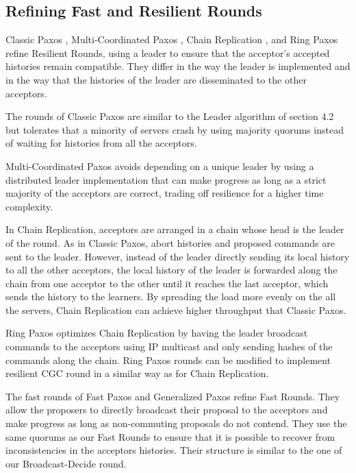 \subsection{Refining Fast and Resilient Rounds}

Classic Paxos \cite{lamport2001paxos}, Multi-Coordinated Paxos \cite{CamargosSchmidtPedone07MulticoordinatedPaxos}, Chain Replication \cite{RenesseSchneider04ChainReplicationSupportingHighThroughputAvailability}, and Ring Paxos \cite{MarandiETAL10RingPaxosHighthroughputAtomicBroadcastProtocol} refine Resilient Rounds, using a leader to ensure that the acceptor's accepted histories remain compatible. They differ in the way the leader is
implemented and in the way that the histories of the leader are disseminated to
the other acceptors.

The rounds of Classic Paxos are similar to the Leader algorithm of section 4.2 but
tolerates that a minority of servers crash by using majority quorums instead of
waiting for histories from all the acceptors.

Multi-Coordinated Paxos avoids depending on a unique leader by using a
distributed leader implementation that can make progress as long as a strict
majority of the acceptors are correct, trading off resilience for a higher time
complexity.

In Chain Replication, acceptors are arranged in a chain whose head is
the leader of the round. As in Classic Paxos, abort histories and
proposed commands are sent to the leader. However, instead of the
leader directly sending its local history to all the other acceptors,
the local history of the leader is
forwarded along the chain from one acceptor to the other until it
reaches the last acceptor, which sends the history to the learners. 
By spreading the load more evenly on the all the servers, Chain Replication
can achieve higher throughput that Classic Paxos.

Ring Paxos optimizes Chain Replication by having the leader broadcast
commands to the acceptors using IP multicast and only sending hashes
of the commands along the chain. Ring Paxos rounds can be modified to implement
resilient CGC round in a similar way as for Chain Replication.

The fast rounds of Fast Paxos \cite{Lamport06FastPaxos} and Generalized Paxos \cite{Lamport05GeneralizeConsensus} refine Fast Rounds.
They allow the proposers to directly broadcast their proposal to the 
acceptors and make progress as long as non-commuting proposals do not contend.
They use the same quorums as our Fast Rounds to ensure that it is possible to recover from inconsistencies 
in the acceptors histories.
Their structure is similar to the one of our Broadcast-Decide round.

